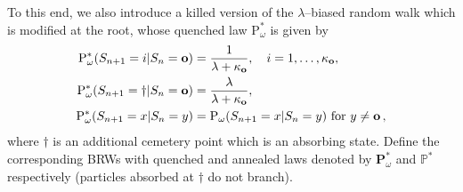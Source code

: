 \documentclass[11 pt]{article}
\theoremstyle{definition}
\numberwithin{equation}{section}
\newcommand{\PP}{\mathbb{P}} %
\newcommand{\Pm}{\mathrm{P}} %
\newcommand{\rt}{\mathbf{o}} %
\begin{document}
To this end, we also introduce a killed version of the $\lambda$--biased random walk which is modified at the root, whose quenched law $\Pm^*_{\omega}$ is given by
\begin{align*}
	\Pm^*_{\omega}(S_{n+1} = i | S_{n} =\rt) 	&=\frac{1}{\lambda + \kappa_{\rt}},\quad i=1,\ldots, \kappa_{\rt},\\
	\Pm^*_{\omega}(S_{n+1} = \dagger | S_{n} =\rt) &=\frac{\lambda}{\lambda +\kappa_{\rt}},\\ 
	\Pm^*_{\omega}(S_{n+1} = x | S_{n} =y) 	&= \Pm_{\omega}(S_{n+1} = x | S_{n} =y) \hbox{ for } y\neq \rt\, ,
\end{align*}
where $\dagger$ is an additional cemetery point which is an absorbing state. 
Define the corresponding BRWs with quenched and annealed laws denoted by $\mathbf{P}^*_{\omega}$ and $\PP^*$ respectively (particles absorbed at $\dagger$ do not branch). 
\end{document}
